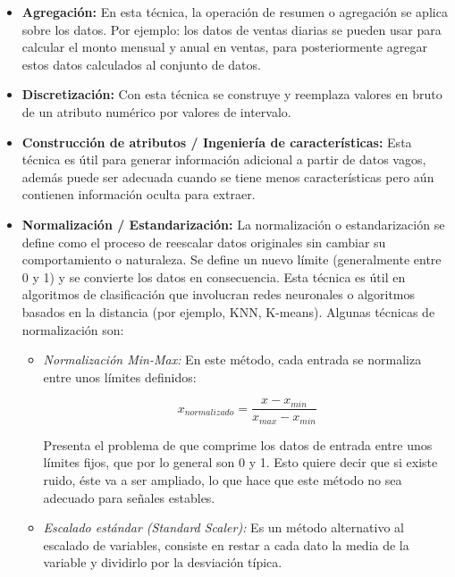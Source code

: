 \begin{itemize}
\item \textbf{Agregaci\'{o}n: }En esta t\'{e}cnica, la operaci\'{o}n de resumen o agregaci\'{o}n se aplica sobre los datos. Por ejemplo: los datos de ventas diarias se pueden usar para calcular el monto mensual y anual en ventas, para posteriormente agregar estos datos calculados al conjunto de datos.

\item \textbf{Discretizaci\'{o}n: }Con esta t\'{e}cnica se construye y reemplaza valores en bruto de un atributo num\'{e}rico por valores de intervalo.

\item \textbf{Construcci\'{o}n de atributos / Ingenier\'{i}a de caracter\'{i}sticas: }Esta t\'{e}cnica es \'{u}til para generar informaci\'{o}n adicional a partir de datos vagos, adem\'{a}s puede ser adecuada cuando se tiene menos caracter\'{i}sticas pero a\'{u}n contienen informaci\'{o}n oculta para extraer.

\item \textbf{Normalizaci\'{o}n / Estandarizaci\'{o}n: }La normalizaci\'{o}n o estandarizaci\'{o}n se define como el proceso de reescalar datos originales sin cambiar su comportamiento o naturaleza. Se define un nuevo l\'{i}mite (generalmente entre 0 y 1) y se convierte los datos en consecuencia. Esta t\'{e}cnica es \'{u}til en algoritmos de clasificaci\'{o}n que involucran redes neuronales o algoritmos basados en la distancia (por ejemplo, KNN, K-means). Algunas t\'{e}cnicas de normalizaci\'{o}n son:
\begin{itemize}
\item \textit{Normalizaci\'{o}n Min-Max: }En este m\'{e}todo, cada entrada se normaliza entre unos l\'{i}mites definidos:

\begin{equation}
x_{normalizado} = \frac{x - x_{min}}{x_{max}-x_{min}}
\end{equation}

Presenta el problema de que comprime los datos de entrada entre unos límites fijos, que por lo general son 0 y 1. Esto quiere decir que si existe ruido, éste va a ser ampliado, lo que hace que este m\'{e}todo no sea adecuado para señales estables.

\item \textit{Escalado est\'{a}ndar (Standard Scaler): }Es un m\'{e}todo alternativo al escalado de variables, consiste en restar a cada dato la media de la variable y dividirlo por la desviaci\'{o}n t\'{i}pica.


\end{itemize}
\end{itemize}
